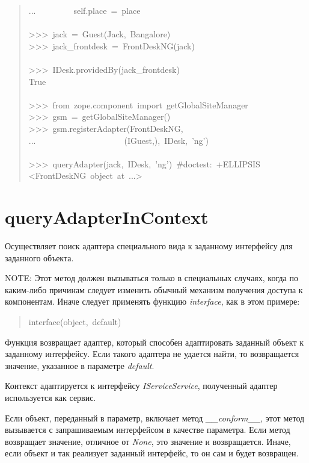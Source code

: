 \documentclass[a4paper,openany,twoside,final]{book}
\providecommand*{\DUroletitlereference}[1]{\textsl{#1}}
\begin{document}
\begin{quote}
{...~~~~~~~~~self.place~=~place\\
~\\
>{}>{}>~jack~=~Guest(\textquotedbl{}Jack\textquotedbl{},~\textquotedbl{}Bangalore\textquotedbl{})\\
>{}>{}>~jack\_frontdesk~=~FrontDeskNG(jack)\\
~\\
>{}>{}>~IDesk.providedBy(jack\_frontdesk)\\
True\\
~\\
>{}>{}>~from~zope.component~import~getGlobalSiteManager\\
>{}>{}>~gsm~=~getGlobalSiteManager()\\
>{}>{}>~gsm.registerAdapter(FrontDeskNG,\\
...~~~~~~~~~~~~~~~~~~~~~(IGuest,),~IDesk,~'ng')\\
~\\
>{}>{}>~queryAdapter(jack,~IDesk,~'ng')~\#doctest:~+ELLIPSIS\\
<FrontDeskNG~object~at~...>
}
\end{quote}


\section*{queryAdapterInContext%
  \label{queryadapterincontext}%
}

Осуществляет поиск адаптера специального вида к заданному интерфейсу
для заданного объекта.

NOTE: Этот метод должен вызываться только в специальных случаях, когда
по каким-либо причинам следует изменить обычный механизм получения
доступа к компонентам.  Иначе следует применять функцию \DUroletitlereference{interface},
как в этом примере:

\begin{quote}{\ttfamily \raggedright \noindent
interface(object,~default)
}
\end{quote}

Функция возвращает адаптер, который способен адаптировать заданный
объект к заданному интерфейсу.  Если такого адаптера не удается найти,
то возвращается значение, указанное в параметре \DUroletitlereference{default}.

Контекст адаптируется к интерфейсу \DUroletitlereference{IServiceService}, полученный адаптер
используется как сервис.

Если объект, переданный в параметр, включает метод \DUroletitlereference{\_\_conform\_\_}, этот
метод вызывается с запрашиваемым интерфейсом в качестве параметра.
Если метод возвращает значение, отличное от \DUroletitlereference{None}, это значение
и возвращается.  Иначе, если объект и так реализует заданный
интерфейс, то он сам и будет возвращен.
\end{document}
